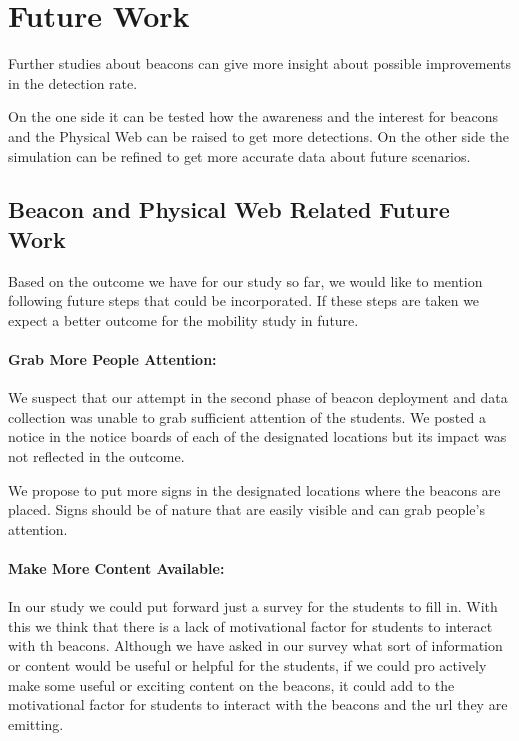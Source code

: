 \section{Future Work}

Further studies about beacons can give more insight about possible improvements in the detection rate. 
\par On the one side it can be tested how the awareness and the interest for beacons and the Physical Web can be raised to get more detections. On the other side the simulation can be refined to get more accurate data about future scenarios.

\subsection{Beacon and Physical Web Related Future Work}
Based on the outcome we have for our study so far, we would like to mention following future steps that could be incorporated. If these steps are taken we expect a better outcome for the mobility study in future.

\paragraph{Grab More People Attention:}
We suspect that our attempt in the second phase of beacon deployment and data collection was unable to grab sufficient attention of the students. We posted a notice in the notice boards of each of the designated locations but its impact was not reflected in the outcome.

\par We propose to put more signs in the designated locations where the beacons are placed. Signs should  be of nature that are easily visible and can grab people's attention.

\paragraph{Make More Content Available:}
In our study we could put forward just a survey for the students to fill in. With this we think that there is a lack of motivational factor for students to interact with th beacons. Although we have asked in our survey what sort of information or content would be useful or helpful for the students, if we could pro actively make some useful or exciting content on the beacons, it could add to the motivational factor for students to interact with the beacons and the url they are emitting.


